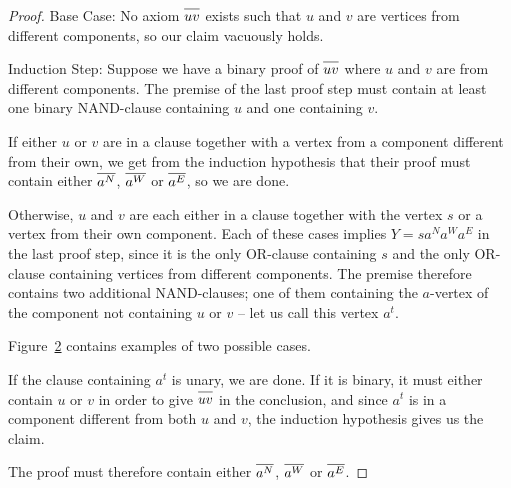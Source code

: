 \begin{proof}
  Base Case:
  No axiom $\ol{uv}$ exists such that $u$ and $v$ are vertices from different components, so our claim vacuously holds.

  Induction Step:
  Suppose we have a binary proof of $\ol{uv}$ where $u$ and $v$ are from different components.
  The premise of the last proof step must contain at least one binary NAND-clause containing $u$ and one containing $v$.\par
  \begin{figure}[!h]
    \centering
    \begin{prooftree*}
      \Hypo{\dots}
    \end{prooftree*}
    \caption{}
    \label{fig:proof_scheme_uv}
  \end{figure}
  If either $u$ or $v$ are in a clause together with a vertex from a component different from their own, we get from the induction hypothesis that their proof must contain either $\ol{a^N}$, $\ol{a^W}$ or $\ol{a^E}$, so we are done.

  Otherwise, $u$ and $v$ are each either in a clause together with the vertex $s$ or a vertex from their own component.
  Each of these cases implies $Y = sa^Na^Wa^E$ in the last proof step, since it is the only OR-clause containing $s$ and the only OR-clause containing vertices from different components.
  The premise therefore contains two additional NAND-clauses; one of them containing the $a$-vertex of the component not containing $u$ or $v$ -- let us call this vertex $a^t$.

  Figure~\ref{fig:proof_example_uv} contains examples of two possible cases.\par
  \begin{figure}[!h]
    \centering
    \begin{prooftree}
    \end{prooftree}
    \hspace{5mm}
    \begin{prooftree}
    \end{prooftree}
    \caption{}
    \label{fig:proof_example_uv}
  \end{figure}
  If the clause containing $a^t$ is unary, we are done.
  If it is binary, it must either contain $u$ or $v$ in order to give $\ol{uv}$ in the conclusion, and since $a^t$ is in a component different from both $u$ and $v$, the induction hypothesis gives us the claim.

  The proof must therefore contain either $\ol{a^N}$, $\ol{a^W}$ or $\ol{a^E}$.
\end{proof}
